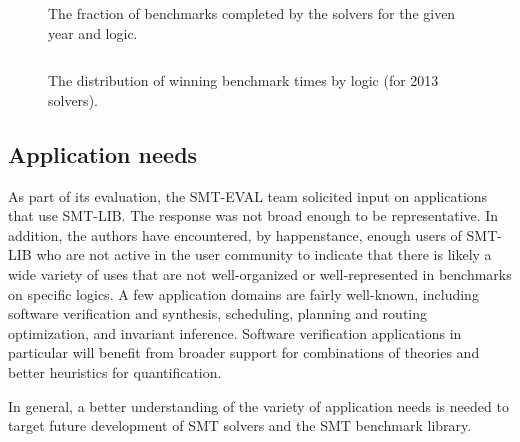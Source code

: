 \documentclass[smallcondensed]{svjour3}
\begin{document}
\begin{figure}
\centering
\begin{tabular}{|l|r|rrrr|rrrr|}
\hline

\end{tabular}
\caption{The fraction of benchmarks completed by the solvers for the given year and logic.}
\label{Fig:completion}
\end{figure}

\begin{figure}
\centering
\begin{tabular}{|l|r|rrrr|}
\hline

\hline
\end{tabular}
\caption{The distribution of winning benchmark times by logic (for 2013 solvers).}
\label{Fig:quintiles}
\end{figure}

\subsection{Application needs}
\label{Applications}

As part of its evaluation, the SMT-EVAL team solicited input on applications that use SMT-LIB. The response was not broad enough to be representative. In addition, the authors 
have encountered, by happenstance, enough users of SMT-LIB who are not active in the user community to indicate that there is likely a wide variety of uses that are not well-organized or well-represented in benchmarks on specific logics. A few application domains are fairly well-known, including software verification and synthesis, scheduling, planning and routing optimization, and invariant inference. Software verification applications in particular will benefit from broader support for combinations of theories and better heuristics for quantification. 

In general, a better understanding of the variety of application needs is needed to target future development of SMT solvers and the SMT benchmark library.
\end{document}
